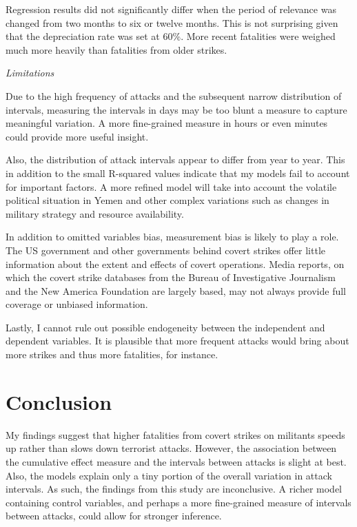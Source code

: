 \documentclass[letterpaper,12pt]{article}
\theoremstyle{definition}
\begin{document}
Regression results did not significantly differ when the period of relevance was changed from two months to six or twelve months. This is not surprising given that the depreciation rate was set at 60\%. More recent fatalities were weighed much more heavily than fatalities from older strikes.  

\noindent\textit{Limitations}

Due to the high frequency of attacks and the subsequent narrow distribution of intervals, measuring the intervals in days may be too blunt a measure to capture meaningful variation. A more fine-grained measure in hours or even minutes could provide more useful insight. 

Also, the distribution of attack intervals appear to differ from year to year. This in addition to the small R-squared values indicate that my models fail to account for important factors. A more refined model will take into account the volatile political situation in Yemen and other complex variations such as changes in military strategy and resource availability.

In addition to omitted variables bias, measurement bias is likely to play a role. The US government and other governments behind covert strikes offer little information about the extent and effects of covert operations. Media reports, on which the covert strike databases from the Bureau of Investigative Journalism and the New America Foundation are largely based, may not always provide full coverage or unbiased information. 

Lastly, I cannot rule out possible endogeneity between the independent and dependent variables. It is plausible that more frequent attacks would bring about more strikes and thus more fatalities, for instance.

\section{Conclusion}

My findings suggest that higher fatalities from covert strikes on militants speeds up rather than slows down terrorist attacks. However, the association between the cumulative effect measure and the intervals between attacks is slight at best. Also, the models explain only a tiny portion of the overall variation in attack intervals. As such, the findings from this study are inconclusive. A richer model containing control variables, and perhaps a more fine-grained measure of intervals between attacks, could allow for stronger inference. 
\end{document}
